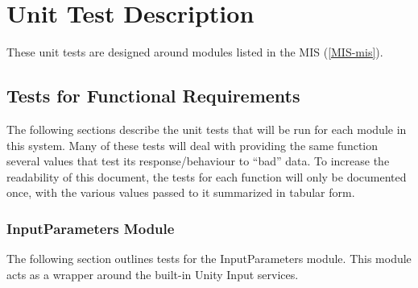 \documentclass[12pt, titlepage]{article}
\begin{document}

\section{Unit Test Description}
These unit tests are designed around modules listed in the MIS (\ref{MIS-mis}).


\subsection{Tests for Functional Requirements}
The following sections describe the unit tests that will be run for each module 
in this system. Many of these tests will deal with providing the same function 
several values that test its response/behaviour to ``bad'' data. To increase 
the readability of this document, the tests for each function will only be 
documented once, with the various values passed to it summarized in tabular 
form.

\subsubsection{InputParameters Module}
The following section outlines tests for the InputParameters module. This 
module acts as a wrapper around the built-in Unity Input services.
\end{document}
